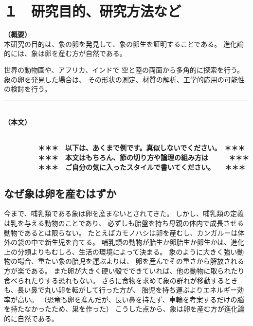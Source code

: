 \documentclass[11pt,a4j,dvipdfmx]{jarticle} 					%
\newcommand{\研究課題名}{象の卵}
\newcommand{\研究機関名}{逢坂大学}
\newcommand{\研究代表者氏名}{湯川秀樹}
\newcommand{\研究期間の最終元号年度}{6}  %
\begin{document}

\section{１　研究目的、研究方法など}

\noindent
\textbf{（概要）}\\
本研究の目的は、象の卵を発見して、象の卵生を証明することである。
進化論的には、象は卵を産む方が自然である。

	世界の動物園や、アフリカ、インドで
	空と陸の両面から多角的に探索を行う。
	象の卵を発見した場合は、
	その形状の測定、材質の解析、工学的応用の可能性の検討を行う。
\vspace*{7zw} %
	

\noindent
\rule{\linewidth}{1pt}\\
\noindent
\textbf{（本文）}
\JSPSInstructions	%

\textbf{\\　　　　　＊＊＊　以下は、あくまで例です。真似しないでください。　＊＊＊\\
　　　　　＊＊＊　本文はもちろん、節の切り方や論理の組み方は　　　＊＊＊\\
　　　　　＊＊＊　ご自分の気に入ったスタイルで書いてください。　　＊＊＊}

\subsection{なぜ象は卵を産むはずか}
今まで、哺乳類である象は卵を産まないとされてきた。
しかし、哺乳類の定義は乳を与える動物のことであり、
必ずしも胎盤を持ち母親の体内で成長させる動物であるとは限らない。
たとえばカモノハシは卵を産むし、カンガルーは体外の袋の中で新生児を育てる。
哺乳類の動物が胎生か卵胎生か卵生かは、進化上の分類よりもむしろ、生活の環境によって決まる。
象のように大きく強い動物の場合、重たい象の胎児を運ぶよりは、
卵を産んでその重さから解放される方が楽である。
また卵が大きく硬い殻でできていれば、他の動物に取られたり食べられたりする恐れもない。
さらに食物を求めて象の群れが移動するときも、長い鼻で丸い卵を転がして行った方が、
胎児を持ち運ぶよりエネルギー効率が高い。
（恐竜も卵を産んだが、長い鼻を持たず、車輪を考案するだけの脳を持たなかったため、巣を作った）
こうした点から、象は卵を産む方が進化論的に自然である。
\end{document}
